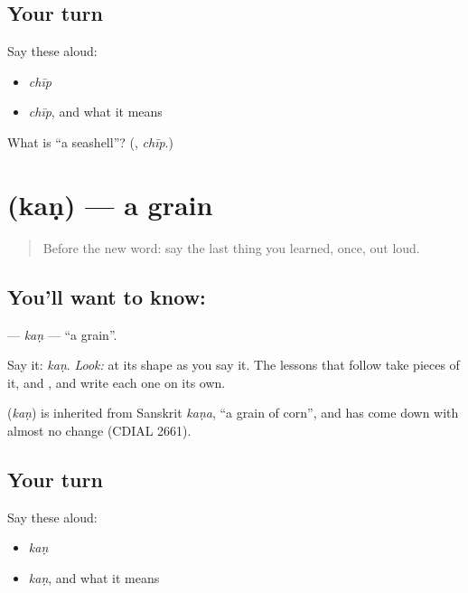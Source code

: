 \subsection*{Your turn}
Say these aloud:

\begin{itemize}
\raggedright
  \item \emph{chīp}
  \item \emph{chīp}, and what it means
\end{itemize}

\begin{tcolorbox}[breakable,colback=teal!4,colframe=teal!35!black,title={Before you move on}]
What is \textquotedblleft{}a seashell\textquotedblright{}? (\textbf{}, \emph{chīp}.)
\end{tcolorbox}
\section[\texorpdfstring{\gu{કણ} (kaṇ)}{કણ (kaṇ)}]{ (kaṇ) — a grain}

\label{lesson:GU-C03-kan}



\begin{quote}
Before the new word: say the last thing you learned, once, out loud.
\end{quote}

\subsection*{You'll want to know: }
\textbf{} — \emph{kaṇ} — \textquotedblleft{}a grain\textquotedblright{}.

Say it: \emph{kaṇ}. \emph{Look:} at its shape as you say it. The lessons that follow take pieces of it, \textbf{} and \textbf{}, and write each one on its own.

\begin{cousinweb}
\textbf{} (\emph{kaṇ}) is inherited from Sanskrit \emph{kaṇa}, \textquotedblleft{}a grain of corn\textquotedblright{}, and has come down with almost no change (CDIAL 2661).
\end{cousinweb}

\subsection*{Your turn}
Say these aloud:

\begin{itemize}
\raggedright
  \item \emph{kaṇ}
  \item \emph{kaṇ}, and what it means
\end{itemize}

